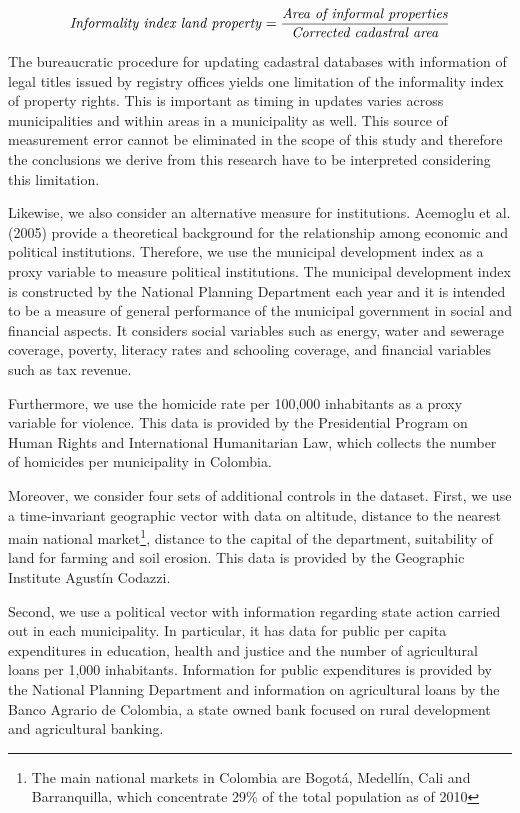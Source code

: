 \[
\text{\emph{Informality index land property}}=\frac{\text{\emph{Area of informal properties}}}{\text{\emph{Corrected cadastral area}}}
\]

The bureaucratic procedure for updating cadastral databases with information of legal titles issued by registry offices yields one limitation of the informality index of property rights. This is important as timing in updates varies across municipalities and within areas in a municipality as well. This source of measurement error cannot be eliminated in the scope of this study and therefore the conclusions we derive from this research have to be interpreted considering this limitation.

Likewise, we also consider an alternative measure for institutions. Acemoglu et al. (2005) provide a theoretical background for the relationship among economic and political institutions. Therefore, we use the municipal development index as a proxy variable to measure political institutions. The municipal development index is constructed by the National Planning Department each year and it is intended to be a measure of general performance of the municipal government in social and financial aspects. It considers social variables such as energy, water and sewerage coverage, poverty, literacy rates and schooling coverage, and financial variables such as tax revenue.

Furthermore, we use the homicide rate per 100,000 inhabitants as a proxy variable for violence. This data is provided by the Presidential Program on Human Rights and International Humanitarian Law, which collects the number of homicides per municipality in Colombia.

Moreover, we consider four sets of additional controls in the dataset. First, we use a time-invariant geographic vector with data on altitude, distance to the nearest main national market\footnote{The main national markets in Colombia are Bogot\'{a}, Medell\'{i}n, Cali and Barranquilla, which concentrate 29\% of the total population as of 2010}, distance to the capital of the department, suitability of land for farming and soil erosion. This data is provided by the Geographic Institute Agust\'{i}n Codazzi.

Second, we use a political vector with information regarding state action carried out in each municipality. In particular, it has data for public per capita expenditures in education, health and justice and the number of agricultural loans per 1,000 inhabitants. Information for public expenditures is provided by the National Planning Department and information on agricultural loans by the Banco Agrario de Colombia, a state owned bank focused on rural development and agricultural banking.

